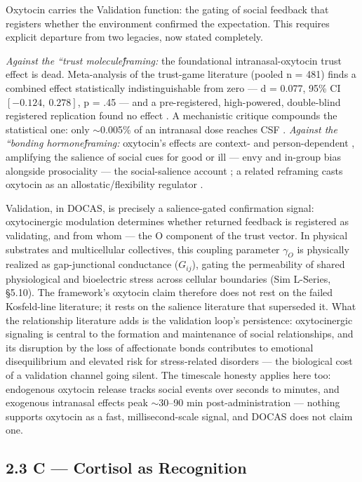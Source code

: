 \documentclass[
]{article}
\begin{document}
Oxytocin carries the Validation function: the gating of social feedback
that registers whether the environment confirmed the expectation. This
requires explicit departure from two legacies, now stated completely.

\emph{Against the ``trust moleculef́́raming:} the foundational
intranasal-oxytocin trust effect is dead. Meta-analysis of the
trust-game literature (pooled n = 481) finds a combined effect
statistically indistinguishable from zero --- d = 0.077, 95\% CI
\([-0.124,\ 0.278]\), p = .45 --- and a pre-registered, high-powered,
double-blind registered replication found no effect . A mechanistic
critique compounds the statistical one: only \(\sim\)0.005\% of an
intranasal dose reaches CSF . \emph{Against the ``bonding
hormonef́́raming:} oxytocin's effects are context- and person-dependent ,
amplifying the salience of social cues for good or ill --- envy and
in-group bias alongside prosociality --- the social-salience account ; a
related reframing casts oxytocin as an allostatic/flexibility regulator
.

Validation, in DOCAS, is precisely a salience-gated confirmation signal:
oxytocinergic modulation determines whether returned feedback is
registered as validating, and from whom --- the O component of the trust
vector. In physical substrates and multicellular collectives, this
coupling parameter \(\gamma_O\) is physically realized as gap-junctional
conductance (\(G_{ij}\)), gating the permeability of shared
physiological and bioelectric stress across cellular boundaries (Sim
L-Series, \S{}5.10). The framework's oxytocin claim therefore does not
rest on the failed Kosfeld-line literature; it rests on the salience
literature that superseded it. What the relationship literature adds is
the validation loop's persistence: oxytocinergic signaling is central to
the formation and maintenance of social relationships, and its
disruption by the loss of affectionate bonds contributes to emotional
disequilibrium and elevated risk for stress-related disorders --- the
biological cost of a validation channel going silent. The timescale
honesty applies here too: endogenous oxytocin release tracks social
events over seconds to minutes, and exogenous intranasal effects peak
\(\sim\)30--90 min post-administration --- nothing supports oxytocin as
a fast, millisecond-scale signal, and DOCAS does not claim one.

\subsection{2.3 C --- Cortisol as
Recognition}\label{c-cortisol-as-recognition}
\end{document}
